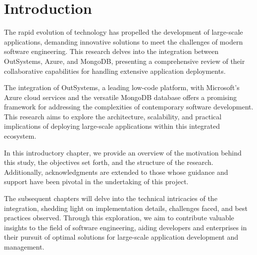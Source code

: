 \section{Introduction}\label{sec:introduction}
    
    The rapid evolution of technology has propelled the development of large-scale applications, demanding innovative solutions to meet the challenges of modern software engineering. This research delves into the integration between OutSystems, Azure, and MongoDB, presenting a comprehensive review of their collaborative capabilities for handling extensive application deployments\cite{iscac}.
    
    The integration of OutSystems, a leading low-code platform, with Microsoft's Azure cloud services and the versatile MongoDB database offers a promising framework for addressing the complexities of contemporary software development. This research aims to explore the architecture, scalability, and practical implications of deploying large-scale applications within this integrated ecosystem.
    
    In this introductory chapter, we provide an overview of the motivation behind this study, the objectives set forth, and the structure of the research. Additionally, acknowledgments are extended to those whose guidance and support have been pivotal in the undertaking of this project.
    
    The subsequent chapters will delve into the technical intricacies of the integration, shedding light on implementation details, challenges faced, and best practices observed. Through this exploration, we aim to contribute valuable insights to the field of software engineering, aiding developers and enterprises in their pursuit of optimal solutions for large-scale application development and management.